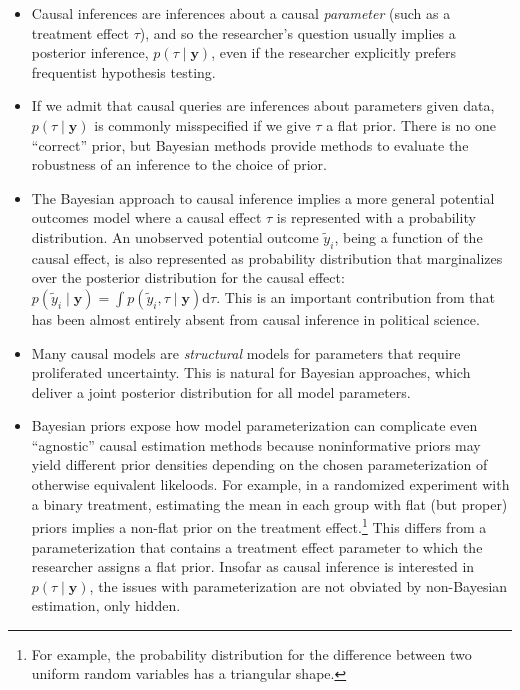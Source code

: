 \documentclass[12pt
              ]{article}
\begin{document}
\begin{itemize}
  \item Causal inferences are inferences about a causal \emph{parameter} (such as a treatment effect $\tau$), and so the researcher's question usually implies a posterior inference, $p(\tau \mid \mathbf{y})$, even if the researcher explicitly prefers frequentist hypothesis testing.
  \item If we admit that causal queries are inferences about parameters given data, $p(\tau \mid \mathbf{y})$ is commonly misspecified if we give $\tau$ a flat prior. There is no one ``correct'' prior, but Bayesian methods provide methods to evaluate the robustness of an inference to the choice of prior.
  \item The Bayesian approach to causal inference implies a more general potential outcomes model where a causal effect $\tau$ is represented with a probability distribution. An unobserved potential outcome $\tilde{y}_{i}$, being a function of the causal effect, is also represented as probability distribution that marginalizes over the posterior distribution for the causal effect: $p(\tilde{y}_{i} \mid \mathbf{y}) = \int p(\tilde{y}_{i}, \tau \mid \mathbf{y}) \mathrm{d}\tau$. This is an important contribution from \textcite{rubin:1978:bayesian} that has been almost entirely absent from causal inference in political science.
  \item Many causal models are \emph{structural} models for parameters that require proliferated uncertainty. This is natural for Bayesian approaches, which deliver a joint posterior distribution for all model parameters.
  \item Bayesian priors expose how model parameterization can complicate even ``agnostic'' causal estimation methods because noninformative priors may yield different prior densities depending on the chosen parameterization of otherwise equivalent likeloods. For example, in a randomized experiment with a binary treatment, estimating the mean in each group with flat (but proper) priors implies a non-flat prior on the treatment effect.\footnote{
    For example, the probability distribution for the difference between two uniform random variables has a triangular shape.
  }
  This differs from a parameterization that contains a treatment effect parameter to which the researcher assigns a flat prior. Insofar as causal inference is interested in $p(\tau \mid \mathbf{y})$, the issues with parameterization are not obviated by non-Bayesian estimation, only hidden.

\end{itemize}
\end{document}
